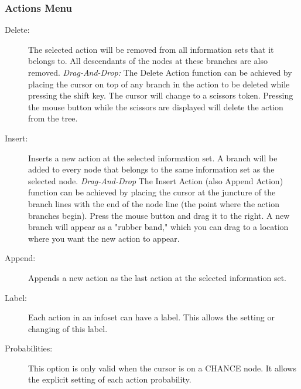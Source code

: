 {\subsubsection{Actions Menu}
\begin{description}
\item[Delete:]  The selected action will be removed from all information sets 
that it belongs to.  All descendants of the nodes at these branches are also removed. 
{\em Drag-And-Drop:}  The Delete Action function can be achieved by placing the cursor 
on top of any branch in the action to be deleted while pressing the shift key.  
The cursor will change 
to a scissors token.  Pressing the mouse button while the scissors are displayed 
will delete the action from the tree. 
\item[Insert:]  Inserts a new action at the selected information set.  A branch 
will be added to every node that belongs to the same information set as the 
selected node. 
{\em Drag-And-Drop}  The Insert Action (also Append Action) function 
can be achieved by 
placing the cursor at the juncture of the branch lines with the end of the node 
line (the point where the action branches begin).  Press the mouse button and drag 
it to the right.  A new branch will appear as a "rubber band,"  which you can drag 
to a location where you want the new action to appear.   
\item[Append:]  Appends a new action as the last action at the selected 
information set.  
\item[Label:]  Each action in an infoset can have a label. 
This allows the setting or changing of this label. 
\item[Probabilities:]  This option is only valid when the cursor is on a
CHANCE node.  It allows the explicit setting of each action probability.
\end{description}

}
